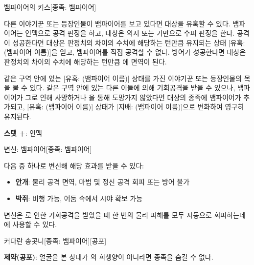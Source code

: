 \documentclass{report}
\begin{document}
	\begin{story}{뱀파이어의 키스}{[종족: 뱀파이어]}
		
		다른 이야기꾼 또는 등장인물이 뱀파이어를 보고 있다면 대상을 유혹할 수 있다. 뱀파이어는 인맥으로 공격 판정을 하고, 대상은 의지 또는 기만으로 수피 판정을 한다. 공격이 성공한다면 대상은 판정치의 차이의 수치에 해당하는 턴만큼 유지되는 상태 [유혹: (뱀파이어 이름)]을 얻고, 뱀파이어를 직접 공격할 수 없다. 방어가 성공한다면 대상은 판정치의 차이의 수치에 해당하는 턴만큼 에 면역이 된다.
		
		\smallskip
		
		같은 구역 안에 있는 [유혹: (뱀파이어 이름)] 상태를 가진 이야기꾼 또는 등장인물의 목을 물 수 있다. 같은 구역 안에 있는 다른 이들에 의해 기회공격을 받을 수 있으나, 뱀파이어가 그로 인해 사망하거나 을 통해 도망가지 않았다면 대상의 종족에 뱀파이어가 추가되고, [유혹: (뱀파이어 이름)] 상태가 [지배: (뱀파이어 이름)]으로 변화하여 영구히 유지된다.
		
		\smallskip
		
		\textbf{스탯 +}: 인맥
		
		\smallskip
		
	\end{story}
	
	\begin{story}{변신: 뱀파이어}{[종족: 뱀파이어]}
		
		다음 중 하나로 변신해 해당 효과를 받을 수 있다:
		\begin{itemize}
			\item \textbf{안개}: 물리 공격 면역, 마법 및 정신 공격 회피 또는 방어 불가
			\item \textbf{박쥐}: 비행 가능, 어둠 속에서 시야 확보 가능
		\end{itemize}
		
		변신은 로 인한 기회공격을 받았을 때 한 번의 물리 피해를 모두 자동으로 회피하는데에 사용할 수 있다.
		
		\smallskip
		
	\end{story}
	
	\begin{story}{커다란 송곳니}{[종족: 뱀파이어][공포]}
		
		\textbf{제약(공포)}: 얼굴을 본 상대가 의 희생양이 아니라면 종족을 숨길 수 없다.
		
		\smallskip
		
	\end{story}
	
\end{document}
